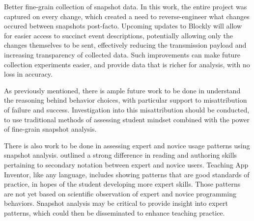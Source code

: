 Better fine-grain collection of snapshot data. In this work, the entire project was captured on every change, which created a need to reverse-engineer what changes occured between snapshots post-facto. Upcoming updates to Blockly will allow for easier access to succinct event descriptions, potentially allowing only the changes themselves to be sent, effectively reducing the transmission payload and increasing transparency of collected data. Such improvements can make future collection experiments easier, and provide data that is richer for analysis, with no loss in accuracy. 

As previously mentioned, there is ample future work to be done in understand the reasoning behind behavior choices, with particular support to misattribution of failure and success. Investigation into this misattribution should be conducted, to use traditional methods of assessing student mindset combined with the power of fine-grain snapshot analysis. 

There is also work to be done in assessing expert and novice usage patterns using snapshot analysis. \cite{petre-1995} outlined a strong difference in reading and authoring skills pertaining to secondary notation between expert and novice users. Teaching App Inventor, like any language, includes showing patterns that are good standards of practice, in hopes of the student developing more expert skills. Those patterns are not yet based on scientific observation of expert and novice programming behaviors. Snapshot analysis may be critical to provide insight into expert patterns, which could then be disseminated to enhance teaching practice. 

